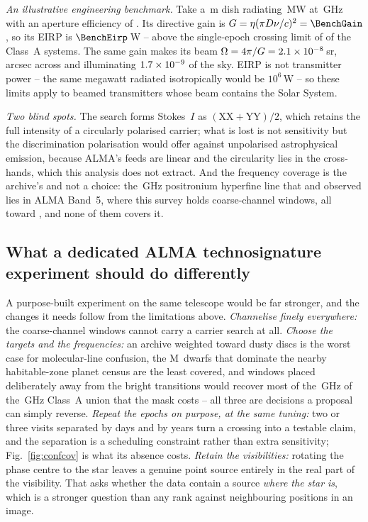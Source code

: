\noindent\emph{An illustrative engineering benchmark.} Take a \BenchDiam\,m dish radiating \BenchPowerMW\,MW at
\BenchFreqGHz\,GHz with an aperture efficiency of \BenchEta. Its directive
gain is $G=\eta(\pi D\nu/c)^{2}=\BenchGain$, so its EIRP is
$\BenchEirp$\,W -- above the single-epoch crossing limit of \BenchNSysA{} of the
\NSysClassA{} Class~A systems. The same gain makes its beam
$\Omega=4\pi/G=2.1\times10^{-8}$\,sr, \BmArcsec{} arcsec across and illuminating
$1.7\times10^{-9}$ of the sky. EIRP is not transmitter power -- the same megawatt
radiated isotropically would be $10^{6}$\,W -- so these limits apply to
beamed transmitters whose beam contains the Solar System.

\noindent\emph{Two blind spots.} The search forms Stokes~$I$ as
$(\mathrm{XX}+\mathrm{YY})/2$, which retains the full intensity of a circularly polarised
carrier; what is lost is not sensitivity but the discrimination polarisation
would offer against unpolarised astrophysical emission, because ALMA's feeds
are linear and the circularity lies in the cross-hands, which this analysis
does not extract. And the frequency coverage is the archive's and not a
choice: the \SbPriorFreqGHz\,GHz positronium hyperfine line that
\citet{Steffes1994} and \citet{Mauersberger1996} observed lies in ALMA Band~5,
where this survey holds
\LnBFiveWin{} coarse-channel windows, all toward \LnBFiveStars, and none of
them covers it.

\subsection{What a dedicated ALMA technosignature experiment should do
differently}
\label{sec:future}

A purpose-built experiment on the same telescope would be far stronger, and
the changes it needs follow from the limitations above. \emph{Channelise
finely everywhere:} the \NCoarse{} coarse-channel windows cannot carry a
carrier search at all.
\emph{Choose the targets and the frequencies:} an archive weighted toward
dusty discs is the worst case for molecular-line confusion, the M~dwarfs that
dominate the nearby habitable-zone planet census are the least covered, and
windows placed deliberately away from the bright transitions would recover
most of the \MkMaskAGHz\,GHz of the \CvUnionA\,GHz Class~A union that the
mask costs -- all three are decisions a
proposal can simply reverse. \emph{Repeat the epochs on purpose, at the same
tuning:} two or three visits separated by days and by years turn a crossing
into a testable claim, and the separation is a scheduling constraint rather
than extra sensitivity; Fig.~\ref{fig:confcov} is what its absence costs.
\emph{Retain the visibilities:} rotating the phase centre to the star leaves a
genuine point source entirely in the real part of the visibility. That asks
whether the data contain a source \emph{where the star is}, which is a
stronger question than any rank
against neighbouring positions in an image.
